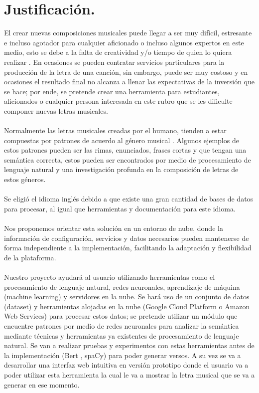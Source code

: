 \documentclass[12pt, a4paper, titlepage]{report}
\begin{document}
    	\section{Justificación.}
    	El crear nuevas composiciones musicales puede llegar a ser muy difícil, estresante e incluso agotador para cualquier aficionado o incluso algunos expertos en este medio, esto se debe a la falta de creatividad y/o tiempo de quien lo quiera realizar \cite{What_about_the_music}. En ocasiones se pueden contratar servicios particulares para la producción de la letra de una canción, sin embargo, puede ser muy costoso y en ocasiones el resultado final no alcanza a llenar las expectativas de la inversión que se hace; por ende, se pretende crear una herramienta para estudiantes, aficionados o cualquier persona interesada en este rubro que se les dificulte componer nuevas letras musicales.\\\\
    	Normalmente las letras musicales creadas por el humano, tienden a estar compuestas por patrones de acuerdo al género musical \cite{genero_musical_en_la_musica_popular}. Algunos ejemplos de estos patrones pueden ser las rimas, enunciados, frases cortas y que tengan una semántica correcta, estos pueden ser encontrados por medio de procesamiento de lenguaje natural y una investigación profunda en la composición de letras de estos géneros.\\\\
    	Se eligió el idioma inglés debido a que existe una gran cantidad de bases de datos para procesar, al igual que herramientas y documentación para este idioma.\\\\
    	Nos proponemos orientar esta solución en un entorno de nube, donde la información de configuración, servicios y datos necesarios pueden mantenerse de forma independiente a la implementación, facilitando la adaptación y flexibilidad de la plataforma.\\\\
    	Nuestro proyecto ayudará al usuario utilizando herramientas como el procesamiento de lenguaje natural, redes neuronales, aprendizaje de máquina (machine learning) y servidores en la nube. Se hará uso de un conjunto de datos (dataset) y herramientas alojadas en la nube (Google Cloud Platform o Amazon Web Services) para procesar estos datos; se pretende utilizar un módulo que encuentre patrones por medio de redes neuronales para analizar la semántica mediante técnicas y herramientas ya existentes de procesamiento de lenguaje natural. Se van a realizar pruebas y experimentos con estas herramientas antes de la implementación (Bert \cite{Bert}, spaCy\cite{spaCy}) para poder generar versos. A su vez se va a desarrollar una interfaz web intuitiva en versión prototipo donde el usuario va a poder utilizar esta herramienta la cual le va a mostrar la letra musical que se va a generar en ese momento.\\\\
\end{document}
